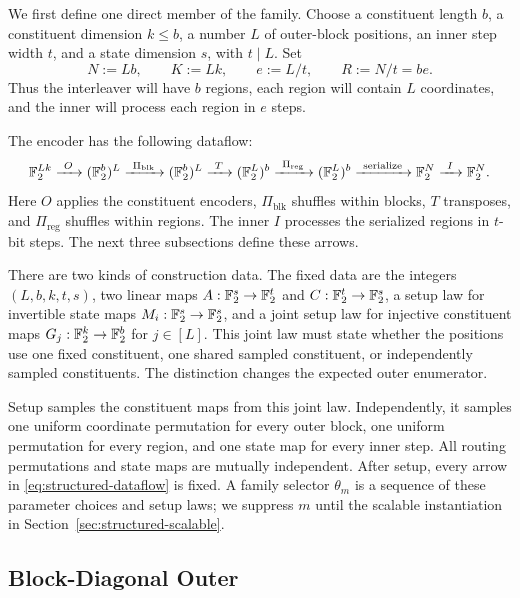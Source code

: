 We first define one direct member of the family. Choose a constituent length
$b$, a constituent dimension $k\le b$, a number $L$ of outer-block
positions, an inner step width $t$, and a state dimension $s$, with $t\mid L$.
Set
\begin{equation}
  N:=Lb,
  \qquad
  K:=Lk,
  \qquad
  e:=L/t,
  \qquad
  R:=N/t=be.
  \label{eq:structured-parameters}
\end{equation}
Thus the interleaver will have $b$ regions, each region will contain $L$
coordinates, and the inner will process each region in $e$ steps.

The encoder has the following dataflow:
\begin{equation}
\mathbb F_2^{Lk}
  \xrightarrow{\ O\ }
(\mathbb F_2^b)^L
  \xrightarrow{\ \Pi_{\mathrm{blk}}\ }
(\mathbb F_2^b)^L
  \xrightarrow{\ T\ }
(\mathbb F_2^L)^b
  \xrightarrow{\ \Pi_{\mathrm{reg}}\ }
(\mathbb F_2^L)^b
  \xrightarrow{\ \mathrm{serialize}\ }
\mathbb F_2^N
  \xrightarrow{\ I\ }
\mathbb F_2^N.
\label{eq:structured-dataflow}
\end{equation}
Here $O$ applies the constituent encoders, $\Pi_{\mathrm{blk}}$ shuffles
within blocks, $T$ transposes, and $\Pi_{\mathrm{reg}}$ shuffles within
regions. The inner $I$ processes the serialized regions in $t$-bit steps.
The next three subsections define these arrows.

There are two kinds of construction data. The fixed data are the integers
$(L,b,k,t,s)$, two linear maps $A:\mathbb F_2^s\to\mathbb F_2^t$ and
$C:\mathbb F_2^t\to\mathbb F_2^s$, a setup law for invertible state maps $M_i:\mathbb F_2^s\to\mathbb F_2^s$, and a joint setup law for
injective constituent maps $G_j:\mathbb F_2^k\to\mathbb F_2^b$ for $j\in[L]$.
This joint law must state whether the positions use one fixed constituent, one
shared sampled constituent, or independently sampled constituents. The
distinction changes the expected outer enumerator.

Setup samples the constituent maps from this joint law. Independently, it
samples one uniform coordinate permutation for every outer block, one uniform
permutation for every region, and one state map for
every inner step. All routing permutations and state maps are mutually
independent. After setup, every arrow in
\eqref{eq:structured-dataflow} is fixed. A family selector $\theta_m$ is a
sequence of these parameter choices and setup laws; we suppress $m$ until the
scalable instantiation in Section~\ref{sec:structured-scalable}.

\subsection{Block-Diagonal Outer}

